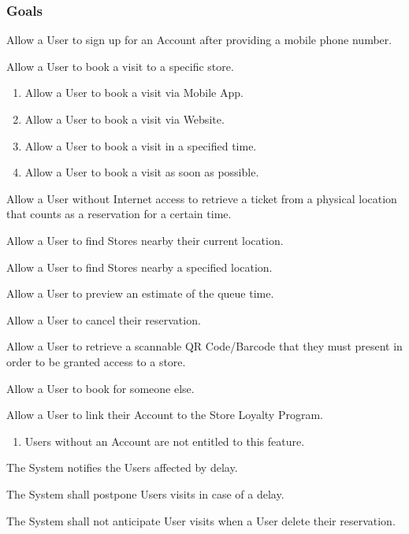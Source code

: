 \subsubsection{Goals}
\begin{enumerate}[label={[G\arabic*]}]
    \item Allow a User to sign up for an Account after providing a mobile phone number.
    \item Allow a User to book a visit to a specific store.
        \begin{enumerate}
            \item Allow a User to book a visit via Mobile App.
            \item Allow a User to book a visit via Website.
            \item Allow a User to book a visit in a specified time.
            \item Allow a User to book a visit as soon as possible.
        \end{enumerate}
    \item Allow a User without Internet access to retrieve a ticket from a physical location that counts as a reservation for a certain time.
    \item Allow a User to find Stores nearby their current location.
    \item {}Allow a User to find Stores nearby a specified location.
    \item Allow a User to preview an estimate of the queue time.
    \item Allow a User to cancel their reservation.
    \item Allow a User to retrieve a scannable QR Code/Barcode that they must present in order to be granted access to a store.
    \item Allow a User to book for someone else.
    \item Allow a User to link their Account to the Store Loyalty Program.
        \begin{enumerate}
            \item Users without an Account are not entitled to this feature.
        \end{enumerate}
    \item The System notifies the Users affected by delay.
    \item The System shall postpone Users visits in case of a delay.
    \item The System shall not anticipate User visits when a User delete their reservation.

\end{enumerate}
